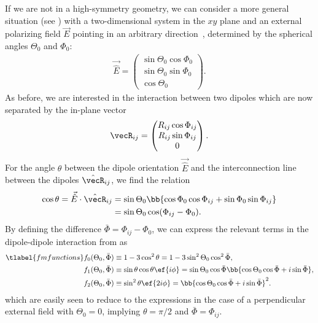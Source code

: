 If we are not in a high-symmetry geometry, we can consider a more general situation (see ) with a two-dimensional system in the $xy$ plane and an external polarizing field $\vec{E}$ pointing in an arbitrary direction~\cite{Gorshkov2011c}, determined by the spherical angles $\Theta_0$ and $\Phi_0$:
\begin{align}
    \vec{\hat{E}}=\begin{pmatrix}
        \sin\Theta_0\cos\Phi_0 \\
        \sin\Theta_0\sin\Phi_0 \\
        \cos\Theta_0
    \end{pmatrix}.
\end{align}
As before, we are interested in the interaction between two dipoles which are now separated
by the in-plane vector
\begin{align}
\vecR_{ij} = \begin{pmatrix}R_{ij} \cos\Phi_{ij} \\ R_{ij} \sin\Phi_{ij} \\ 0\end{pmatrix}.
\end{align}
For the angle $\theta$ between the dipole orientation $\vec{\hat{E}}$ and the interconnection line between the dipoles $\hat{\vecR}_{ij}$, we find the relation
\begin{align}
    \cos\theta = \vec{\hat{E}} \cdot \hat{\vecR}_{ij} &= \sin\Theta_0\bb{\cos\Phi_0\cos\Phi_{ij}+\sin\Phi_0\sin\Phi_{ij}}\\
                                                      &=\sin\Theta_0\cos(\Phi_{ij}-\Phi_0).
\end{align}
By defining the difference $\bar\Phi=\Phi_{ij}-\Phi_0$, we can express the relevant terms in the dipole-dipole interaction from  as
\begin{align} \tlabel{fmfunctions}
    f_0(\Theta_0, \bar \Phi)&\equiv 1-3\cos^2\theta = 1-3\sin^2\Theta_0\cos^2\bar\Phi, \vphantom{\bb{\bar \Phi}} \\
    f_1(\Theta_0, \bar \Phi)&\equiv \sin\theta\cos\theta \ef{i\phi} = \sin\Theta_0 \cos\bar\Phi \bb{\cos\Theta_0 \cos\bar\Phi + i \sin \bar\Phi}, \\
    f_2(\Theta_0, \bar \Phi)&\equiv\sin^2\theta \ef{2i\phi} = \bb{\cos\Theta_0 \cos\bar\Phi + i \sin \bar\Phi}^2.
\end{align}
which are easily seen to reduce to the expressions  in the case of a perpendicular external field with $\Theta_0=0$, implying $\theta=\pi/2$ and $\bar\Phi=\Phi_{ij}$.
